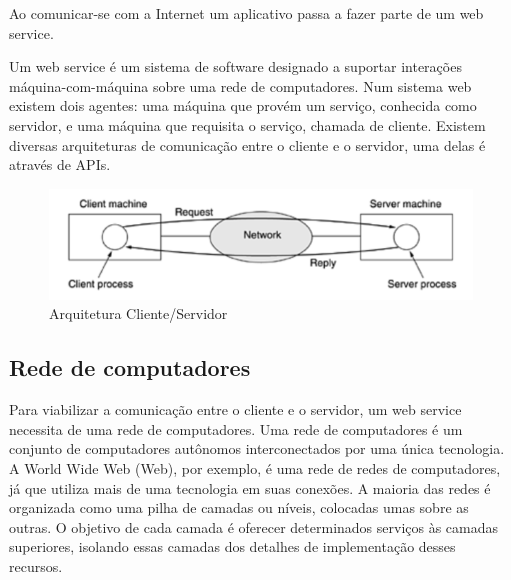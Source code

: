 Ao comunicar-se com a Internet um aplicativo passa a fazer parte de um web 
service.

Um web service é um sistema de software designado a suportar interações
máquina-com-máquina sobre uma rede de computadores. \cite{Ferris2004}
Num sistema web existem dois agentes: uma máquina que provém um serviço,
conhecida como servidor, e uma máquina que requisita o serviço, chamada 
de cliente. Existem diversas arquiteturas de comunicação entre o cliente e o 
servidor, uma delas é através de APIs. \cite{Tanenbaum2011}

\begin{figure}[H]
    \centering
    \includegraphics[scale=0.8]{images/client_server}
    \caption[Arquitetura Cliente/Servidor]
    {Arquitetura Cliente/Servidor \cite{Tanenbaum2011}}
    \label{fig:client_server}
\end{figure}


\subsection{Rede de computadores}
Para viabilizar a comunicação entre o cliente e o servidor, 
um web service necessita de uma rede de computadores.
Uma rede de computadores é um conjunto de computadores autônomos 
interconectados por uma única tecnologia. \cite{Tanenbaum2011}
A World Wide Web (Web), por exemplo, é uma rede de redes de 
computadores, \cite{Tanenbaum2011} já que utiliza mais de uma tecnologia em suas 
conexões.
A maioria das redes é organizada como uma pilha de camadas ou níveis, 
colocadas umas sobre as outras. \cite{Tanenbaum2011} 
O objetivo de cada camada é oferecer determinados serviços às camadas superiores, 
isolando essas camadas dos detalhes de implementação desses recursos. 
\cite{Tanenbaum2011}

